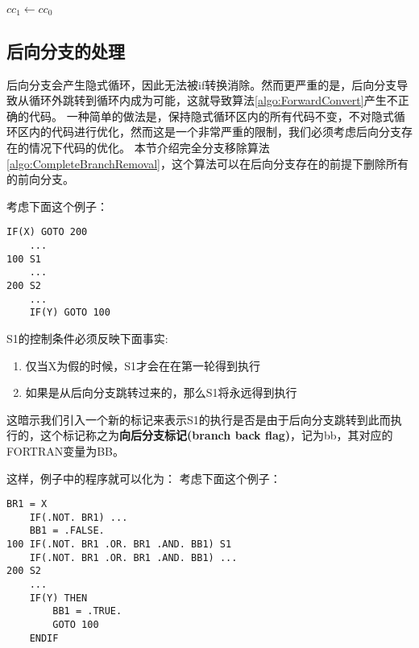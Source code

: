 \documentclass[11pt,a4paper]{article}
\begin{document}
\begin{algorithm}[H]
	\label{algo:ForwardConvert}
	\caption{$forward\_convert\left(x,cc_0\right)$}
	$cc_1\leftarrow cc_0$\;
\end{algorithm}

\subsection{后向分支的处理}
后向分支会产生隐式循环，因此无法被if转换消除。然而更严重的是，后向分支导致从循环外跳转到循环内成为可能，这就导致算法\ref{algo:ForwardConvert}产生不正确的代码。
一种简单的做法是，保持隐式循环区内的所有代码不变，不对隐式循环区内的代码进行优化，然而这是一个非常严重的限制，我们必须考虑后向分支存在的情况下代码的优化。
本节介绍完全分支移除算法\ref{algo:CompleteBranchRemoval}，这个算法可以在后向分支存在的前提下删除所有的前向分支。

考虑下面这个例子：
\begin{lstlisting}[language=FORTRAN]
	IF(X) GOTO 200
	...
100	S1
	...
200	S2
	...
	IF(Y) GOTO 100
\end{lstlisting}

S1的控制条件必须反映下面事实:
\begin{enumerate}
\item 仅当X为假的时候，S1才会在在第一轮得到执行
\item 如果是从后向分支跳转过来的，那么S1将永远得到执行
\end{enumerate}
这暗示我们引入一个新的标记来表示S1的执行是否是由于后向分支跳转到此而执行的，这个标记称之为\textbf{向后分支标记(branch back flag)}，记为bb，其对应的FORTRAN变量为BB。

这样，例子中的程序就可以化为：
考虑下面这个例子：
\begin{lstlisting}[language=FORTRAN]
	BR1 = X
	IF(.NOT. BR1) ...
	BB1 = .FALSE.
100	IF(.NOT. BR1 .OR. BR1 .AND. BB1) S1
	IF(.NOT. BR1 .OR. BR1 .AND. BB1) ...
200	S2
	...
	IF(Y) THEN
		BB1 = .TRUE.
		GOTO 100
	ENDIF
\end{lstlisting}
\end{document}
